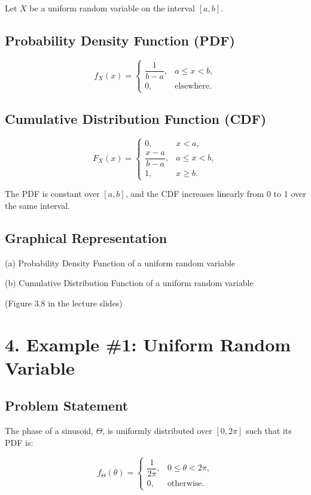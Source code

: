\documentclass[12pt]{article}
\begin{document}
Let $X$ be a uniform random variable on the interval $[a,b]$.

\subsection*{Probability Density Function (PDF)}

\[
f_X(x) =
\begin{cases}
\dfrac{1}{b-a}, & a \le x < b, \\
0, & \text{elsewhere}.
\end{cases}
\]

\subsection*{Cumulative Distribution Function (CDF)}

\[
F_X(x) =
\begin{cases}
0, & x < a, \\
\dfrac{x-a}{b-a}, & a \le x < b, \\
1, & x \ge b.
\end{cases}
\]

The PDF is constant over $[a,b]$, and the CDF increases linearly from $0$ to $1$ over the same interval.

\subsection*{Graphical Representation}

(a) Probability Density Function of a uniform random variable

(b) Cumulative Distribution Function of a uniform random variable

(Figure 3.8 in the lecture slides)

\section*{4. Example \#1: Uniform Random Variable}

\subsection*{Problem Statement}

The phase of a sinusoid, $\Theta$, is uniformly distributed over $[0,2\pi]$ such that its PDF is:

\[
f_{\Theta}(\theta) =
\begin{cases}
\dfrac{1}{2\pi}, & 0 \le \theta < 2\pi, \\
0, & \text{otherwise}.
\end{cases}
\]
\end{document}
